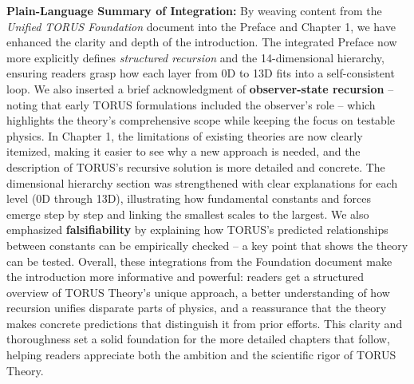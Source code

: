 \documentclass[
]{article}
\begin{document}
\textbf{Plain-Language Summary of Integration:} By weaving content from
the \emph{Unified TORUS Foundation} document into the Preface and
Chapter 1, we have enhanced the clarity and depth of the introduction.
The integrated Preface now more explicitly defines \emph{structured
recursion} and the 14-dimensional hierarchy, ensuring readers grasp how
each layer from 0D to 13D fits into a self-consistent loop. We also
inserted a brief acknowledgment of \textbf{observer-state recursion} --
noting that early TORUS formulations included the observer's role --
which highlights the theory's comprehensive scope while keeping the
focus on testable physics. In Chapter 1, the limitations of existing
theories are now clearly itemized, making it easier to see why a new
approach is needed, and the description of TORUS's recursive solution is
more detailed and concrete. The dimensional hierarchy section was
strengthened with clear explanations for each level (0D through 13D),
illustrating how fundamental constants and forces emerge step by step
and linking the smallest scales to the largest. We also emphasized
\textbf{falsifiability} by explaining how TORUS's predicted
relationships between constants can be empirically checked -- a key
point that shows the theory can be tested. Overall, these integrations
from the Foundation document make the introduction more informative and
powerful: readers get a structured overview of TORUS Theory's unique
approach, a better understanding of how recursion unifies disparate
parts of physics, and a reassurance that the theory makes concrete
predictions that distinguish it from prior efforts. This clarity and
thoroughness set a solid foundation for the more detailed chapters that
follow, helping readers appreciate both the ambition and the scientific
rigor of TORUS Theory.
\end{document}
